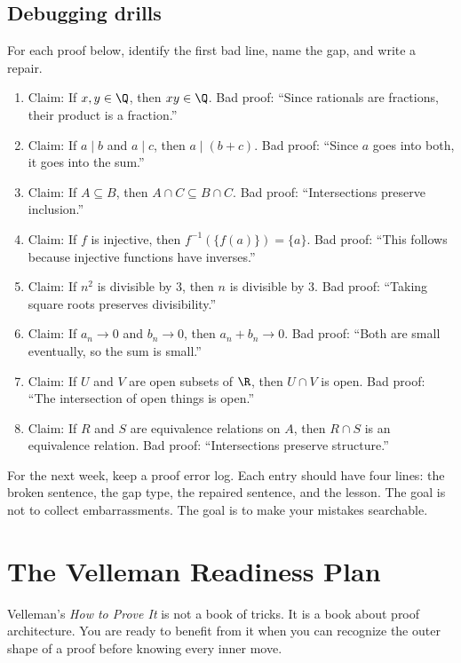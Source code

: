 \subsection{Debugging drills}

For each proof below, identify the first bad line, name the gap, and write a repair.

\begin{enumerate}
\item Claim: If $x,y\in\Q$, then $xy\in\Q$. Bad proof: ``Since rationals are fractions, their product is a fraction.''
\item Claim: If $a\mid b$ and $a\mid c$, then $a\mid(b+c)$. Bad proof: ``Since $a$ goes into both, it goes into the sum.''
\item Claim: If $A\subseteq B$, then $A\cap C\subseteq B\cap C$. Bad proof: ``Intersections preserve inclusion.''
\item Claim: If $f$ is injective, then $f^{-1}(\{f(a)\})=\{a\}$. Bad proof: ``This follows because injective functions have inverses.''
\item Claim: If $n^2$ is divisible by $3$, then $n$ is divisible by $3$. Bad proof: ``Taking square roots preserves divisibility.''
\item Claim: If $a_n\to0$ and $b_n\to0$, then $a_n+b_n\to0$. Bad proof: ``Both are small eventually, so the sum is small.''
\item Claim: If $U$ and $V$ are open subsets of $\R$, then $U\cap V$ is open. Bad proof: ``The intersection of open things is open.''
\item Claim: If $R$ and $S$ are equivalence relations on $A$, then $R\cap S$ is an equivalence relation. Bad proof: ``Intersections preserve structure.''
\end{enumerate}

\begin{labbox}
For the next week, keep a proof error log. Each entry should have four lines: the broken sentence, the gap type, the repaired sentence, and the lesson. The goal is not to collect embarrassments. The goal is to make your mistakes searchable.
\end{labbox}

\section{The Velleman Readiness Plan}
\chapterline

Velleman's \emph{How to Prove It} is not a book of tricks. It is a book about proof architecture. You are ready to benefit from it when you can recognize the outer shape of a proof before knowing every inner move.

